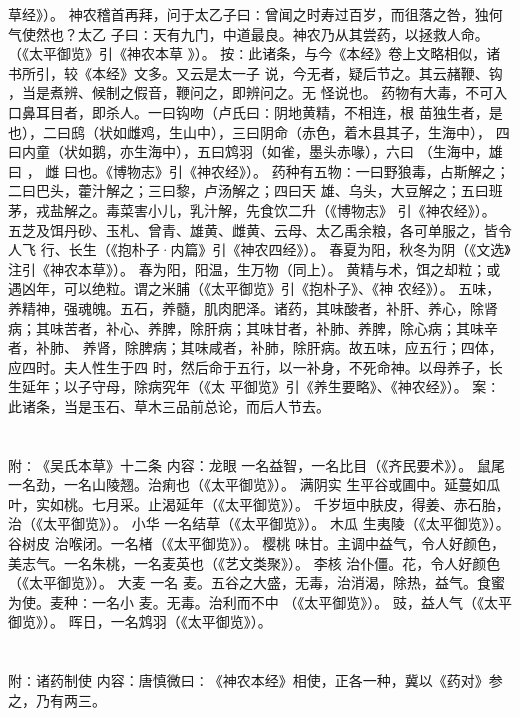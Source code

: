 \documentclass[12pt,UTF8]{ctexbook}
\begin{document}
草经》）。 
神农稽首再拜，问于太乙子曰∶曾闻之时寿过百岁，而徂落之咎，独何气使然也？太乙 
子曰∶天有九门，中道最良。神农乃从其尝药，以拯救人命。（《太平御览》引《神农本草 
》）。 
按∶此诸条，与今《本经》卷上文略相似，诸书所引，较《本经》文多。又云是太一子 
说，今无者，疑后节之。其云赭鞭、钩 ，当是煮辨、候制之假音，鞭问之，即辨问之。无 
怪说也。 
药物有大毒，不可入口鼻耳目者，即杀人。一曰钩吻（卢氏曰∶阴地黄精，不相连，根 
苗独生者，是也），二曰鸱（状如雌鸡，生山中），三曰阴命（赤色，着木县其子，生海中）， 
四曰内童（状如鹅，亦生海中），五曰鸩羽（如雀，墨头赤喙），六曰 （生海中，雄曰 ， 
雌 
曰也。《博物志》引《神农经》）。 
药种有五物∶一曰野狼毒，占斯解之；二曰巴头，藿汁解之；三曰黎，卢汤解之；四曰天 
雄、乌头，大豆解之；五曰班茅，戎盐解之。毒菜害小儿，乳汁解，先食饮二升（《博物志》 
引《神农经》）。 
五芝及饵丹砂、玉札、曾青、雄黄、雌黄、云母、太乙禹余粮，各可单服之，皆令人飞 
行、长生（《抱朴子·内篇》引《神农四经》）。 
春夏为阳，秋冬为阴（《文选》注引《神农本草》）。 
春为阳，阳温，生万物（同上）。 
黄精与术，饵之却粒；或遇凶年，可以绝粒。谓之米脯（《太平御览》引《抱朴子》、《神 
农经》）。 
五味，养精神，强魂魄。五石，养髓，肌肉肥泽。诸药，其味酸者，补肝、养心，除肾 
病；其味苦者，补心、养脾，除肝病；其味甘者，补肺、养脾，除心病；其味辛者，补肺、 
养肾，除脾病；其味咸者，补肺，除肝病。故五味，应五行；四体，应四时。夫人性生于四 
时，然后命于五行，以一补身，不死命神。以母养子，长生延年；以子守母，除病究年（《太 
平御览》引《养生要略》、《神农经》）。 
案∶此诸条，当是玉石、草木三品前总论，而后人节去。 


\section{}附∶《吴氏本草》十二条
内容：龙眼 一名益智，一名比目（《齐民要术》）。 
鼠尾 一名劲，一名山陵翘。治痢也（《太平御览》）。 
满阴实 生平谷或圃中。延蔓如瓜叶，实如桃。七月采。止渴延年（《太平御览》）。 
千岁垣中肤皮，得姜、赤石胎，治（《太平御览》）。 
小华 一名结草（《太平御览》）。 
木瓜 生夷陵（《太平御览》）。 
谷树皮 治喉闭。一名楮（《太平御览》）。 
樱桃 味甘。主调中益气，令人好颜色，美志气。一名朱桃，一名麦英也（《艺文类聚》）。 
李核 治仆僵。花，令人好颜色（《太平御览》）。 
大麦 一名 麦。五谷之大盛，无毒，治消渴，除热，益气。食蜜为使。麦种∶一名小 
麦。无毒。治利而不中 （《太平御览》）。 
豉，益人气（《太平御览》）。 
晖日，一名鸩羽（《太平御览》）。 


\section{}附∶诸药制使
内容：唐慎微曰∶《神农本经》相使，正各一种，冀以《药对》参之，乃有两三。 
\end{document}
